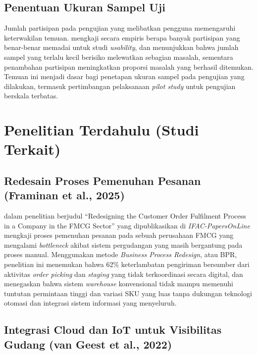 \subsection{Penentuan Ukuran Sampel Uji}

Jumlah partisipan pada pengujian yang melibatkan pengguna memengaruhi keterwakilan temuan. \textcite{alroobaea2014} mengkaji secara empiris berapa banyak partisipan yang benar-benar memadai untuk studi \textit{usability}, dan menunjukkan bahwa jumlah sampel yang terlalu kecil berisiko melewatkan sebagian masalah, sementara penambahan partisipan meningkatkan proporsi masalah yang berhasil ditemukan. Temuan ini menjadi dasar bagi penetapan ukuran sampel pada pengujian yang dilakukan, termasuk pertimbangan pelaksanaan \textit{pilot study} untuk pengujian berskala terbatas.

\section{Penelitian Terdahulu (Studi Terkait)}
\label{sec:penelitian-terdahulu}

\subsection{Redesain Proses Pemenuhan Pesanan (Framinan et al., 2025)}

\textcite{framinan2025} dalam penelitian berjudul ``Redesigning the Customer Order Fulfilment Process in a Company in the FMCG Sector'' yang dipublikasikan di \textit{IFAC-PapersOnLine} mengkaji proses pemenuhan pesanan pada sebuah perusahaan FMCG yang mengalami \textit{bottleneck} akibat sistem pergudangan yang masih bergantung pada proses manual. Menggunakan metode \textit{Business Process Redesign}, atau BPR, penelitian ini menemukan bahwa 62\% keterlambatan pengiriman bersumber dari aktivitas \textit{order picking} dan \textit{staging} yang tidak terkoordinasi secara digital, dan menegaskan bahwa sistem \textit{warehouse} konvensional tidak mampu memenuhi tuntutan permintaan tinggi dan variasi SKU yang luas tanpa dukungan teknologi otomasi dan integrasi sistem informasi yang menyeluruh.

\subsection{Integrasi Cloud dan IoT untuk Visibilitas Gudang (van Geest et al., 2022)}

